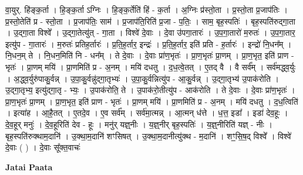 \documentclass[17pt]{extarticle}
\begin{document}
वा॒युर्. हि॑ङ्क॒र्ता । हि॒ङ्क॒र्ता ऽग्निः । हि॒ङ्क॒र्तेति॑ हिं - क॒र्ता । अ॒ग्निः प्र॑स्तो॒ता । प्र॒स्तो॒ता प्र॒जाप॑तिः । प्र॒स्तो॒तेति॑ प्र - स्तो॒ता । प्र॒जाप॑तिः॒ साम॑ । प्र॒जाप॑ति॒रिति॑ प्र॒जा - प॒तिः॒ । साम॒ बृह॒स्पतिः॑ । बृह॒स्पति॑रुद्गा॒ता । उ॒द्गा॒ता विश्वे᳚ । उ॒द्गा॒तेत्यु॑त् - गा॒ता । विश्वे॑ दे॒वाः । दे॒वा उ॑पगा॒तारः॑ । उ॒प॒गा॒तारो॑ म॒रुतः॑ । उ॒प॒गा॒तार॒ इत्यु॑प - गा॒तारः॑ । म॒रुतः॑ प्रतिह॒र्तारः॑ । प्र॒ति॒ह॒र्तार॒ इन्द्रः॑ । प्र॒ति॒ह॒र्तार॒ इति॑ प्रति - ह॒र्तारः॑ । इन्द्रो॑ नि॒धन᳚म् । नि॒धन॒म् ते । नि॒धन॒मिति॑ नि - धन᳚म् । ते दे॒वाः । दे॒वाः प्रा॑ण॒भृतः॑ । प्रा॒ण॒भृतः॑ प्रा॒णम् । प्रा॒ण॒भृत॒ इति॑ प्राण - भृतः॑ । प्रा॒णम् मयि॑ । प्रा॒णमिति॑ प्र - अ॒नम् । मयि॑ दधतु । द॒ध॒त्वे॒तत् । ए॒तद् वै । वै सर्व᳚म् । सर्व॑मद्ध्व॒र्युः । अ॒द्ध्व॒र्युरु॑पाकु॒र्वन्न् । उ॒पा॒कु॒र्वन्नु॑द्गा॒तृभ्यः॑ । उ॒पा॒कु॒र्वन्नित्यु॑प - आ॒कु॒र्वन्न् । उ॒द्गा॒तृभ्य॑ उ॒पाक॑रोति । उ॒द्गा॒तृभ्य॒ इत्यु॑द्गा॒तृ - भ्यः॒ । उ॒पाक॑रोति॒ ते । उ॒पाक॑रो॒तीत्यु॑प - आक॑रोति । ते दे॒वाः । दे॒वाः प्रा॑ण॒भृतः॑ । प्रा॒ण॒भृतः॑ प्रा॒णम् । प्रा॒ण॒भृत॒ इति॑ प्राण - भृतः॑ । प्रा॒णम् मयि॑ । प्रा॒णमिति॑ प्र - अ॒नम् । मयि॑ दधतु । द॒ध॒त्विति॑ । इत्या॑ह । आ॒है॒तत् । ए॒तदे॒व । ए॒व सर्व᳚म् । सर्व॑मा॒त्मन्न् । आ॒त्मन् ध॑त्ते । ध॒त्त॒ इडा᳚ । इडा॑ देव॒हूः । दे॒व॒हूर् मनुः॑ । दे॒व॒हूरिति॑ देव - हूः । मनु॑र् यज्ञ्॒नीः । य॒ज्ञ्॒नीर् बृह॒स्पतिः॑ । य॒ज्ञ्॒नीरिति॑ यज्ञ् - नीः । बृह॒स्पति॑रुक्थाम॒दानि॑ । उ॒क्था॒म॒दानि॑ शꣳसिषत् । उ॒क्था॒म॒दानीत्यु॑क्थ - म॒दानि॑ । शꣳ॒॒सि॒ष॒द् विश्वे᳚ । विश्वे॑ दे॒वाः ( ) । दे॒वाः सू᳚क्त॒वाचः॑ \newline

\textbf{Jatai Paata} \newline
\end{document}
